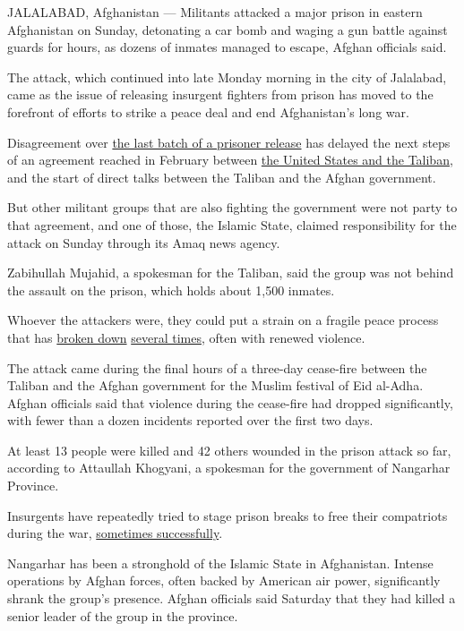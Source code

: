 JALALABAD, Afghanistan --- Militants attacked a major prison in eastern
Afghanistan on Sunday, detonating a car bomb and waging a gun battle
against guards for hours, as dozens of inmates managed to escape, Afghan
officials said.

The attack, which continued into late Monday morning in the city of
Jalalabad, came as the issue of releasing insurgent fighters from prison
has moved to the forefront of efforts to strike a peace deal and end
Afghanistan's long war.

Disagreement over
\href{https://www.nytimes.com/2020/07/28/world/asia/afghanistan-cease-fire-taliban.html}{the
last batch of a prisoner release} has delayed the next steps of an
agreement reached in February between
\href{https://www.nytimes.com/2020/02/29/world/asia/us-taliban-deal.html}{the
United States and the Taliban}, and the start of direct talks between
the Taliban and the Afghan government.

But other militant groups that are also fighting the government were not
party to that agreement, and one of those, the Islamic State, claimed
responsibility for the attack on Sunday through its Amaq news agency.

Zabihullah Mujahid, a spokesman for the Taliban, said the group was not
behind the assault on the prison, which holds about 1,500 inmates.

Whoever the attackers were, they could put a strain on a fragile peace
process that has
\href{https://www.nytimes.com/2019/09/08/world/asia/afghanistan-trump-camp-david-taliban.html}{broken
down}
\href{https://www.nytimes.com/2020/04/07/world/asia/afghan-prisoner-talks-collapse.html}{several
times}, often with renewed violence.

The attack came during the final hours of a three-day cease-fire between
the Taliban and the Afghan government for the Muslim festival of Eid
al-Adha. Afghan officials said that violence during the cease-fire had
dropped significantly, with fewer than a dozen incidents reported over
the first two days.

At least 13 people were killed and 42 others wounded in the prison
attack so far, according to Attaullah Khogyani, a spokesman for the
government of Nangarhar Province.

Insurgents have repeatedly tried to stage prison breaks to free their
compatriots during the war,
\href{https://www.nytimes.com/2011/04/26/world/asia/26afghanistan.html}{sometimes
successfully}.

Nangarhar has been a stronghold of the Islamic State in Afghanistan.
Intense operations by Afghan forces, often backed by American air power,
significantly shrank the group's presence. Afghan officials said
Saturday that they had killed a senior leader of the group in the
province.

